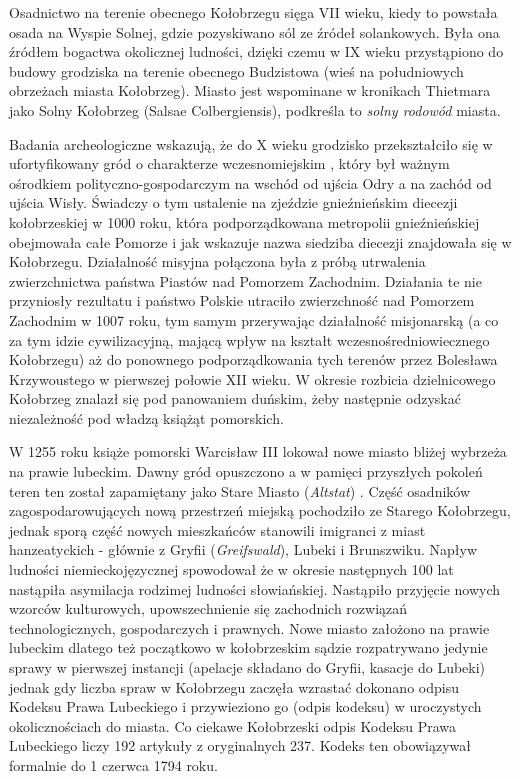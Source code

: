 \documentclass{amuthesis}
\begin{document}
Osadnictwo na terenie obecnego Kołobrzegu sięga VII wieku, kiedy to powstała osada na Wyspie Solnej, gdzie pozyskiwano sól ze źródeł solankowych.
Była ona źródłem bogactwa okolicznej ludności, dzięki czemu w IX wieku przystąpiono do budowy grodziska na terenie obecnego Budzistowa (wieś na południowych obrzeżach miasta Kołobrzeg).
Miasto jest wspominane w kronikach Thietmara jako Solny Kołobrzeg (Salsae Colbergiensis), podkreśla to \emph{solny rodowód} miasta.

Badania archeologiczne wskazują, że do X wieku grodzisko przekształciło się w ufortyfikowany gród o charakterze wczesnomiejskim \autocite{historia_kołobrzeg}, który był ważnym ośrodkiem polityczno-gospodarczym na wschód od ujścia Odry a na zachód od ujścia Wisły.
Świadczy o tym ustalenie na zjeździe gnieźnieńskim diecezji kołobrzeskiej w 1000 roku, która podporządkowana metropolii gnieźnieńskiej obejmowała całe Pomorze i jak wskazuje nazwa siedziba diecezji znajdowała się w Kołobrzegu.
Działalność misyjna połączona była z próbą utrwalenia zwierzchnictwa państwa Piastów nad Pomorzem Zachodnim.
Działania te nie przyniosły rezultatu i państwo Polskie utraciło zwierzchność nad Pomorzem Zachodnim w 1007 roku, tym samym przerywając działalność misjonarską (a co za tym idzie cywilizacyjną, mającą wpływ na kształt wczesnośredniowiecznego Kołobrzegu) aż do ponownego podporządkowania tych terenów przez Bolesława Krzywoustego w pierwszej połowie XII wieku.
W okresie rozbicia dzielnicowego Kołobrzeg znalazł się pod panowaniem duńskim, żeby następnie odzyskać niezależność pod władzą książąt pomorskich.

W 1255 roku książe pomorski Warcisław III lokował nowe miasto bliżej wybrzeża na prawie lubeckim.
Dawny gród opuszczono a w pamięci przyszłych pokoleń teren ten został zapamiętany jako Stare Miasto (\emph{Altstat}) \autocite{historia_kołobrzeg_wiki}.
Część osadników zagospodarowujących nową przestrzeń miejską pochodziło ze Starego Kołobrzegu, jednak sporą część nowych mieszkańców stanowili imigranci z miast hanzeatyckich - głównie z Gryfii (\emph{Greifswald}), Lubeki i Brunszwiku.
Napływ ludności niemieckojęzycznej spowodował że w okresie następnych 100 lat nastąpiła asymilacja rodzimej ludności słowiańskiej.
Nastąpiło przyjęcie nowych wzorców kulturowych, upowszechnienie się zachodnich rozwiązań technologicznych, gospodarczych i prawnych.
Nowe miasto założono na prawie lubeckim dlatego też początkowo w kołobrzeskim sądzie rozpatrywano jedynie sprawy w pierwszej instancji (apelacje składano do Gryfii, kasacje do Lubeki) jednak gdy liczba spraw w Kołobrzegu zaczęła wzrastać dokonano odpisu Kodeksu Prawa Lubeckiego i przywieziono go (odpis kodeksu) w uroczystych okolicznościach do miasta.
Co ciekawe Kołobrzeski odpis Kodeksu Prawa Lubeckiego liczy 192 artykuły z oryginalnych 237.
Kodeks ten obowiązywał formalnie do 1 czerwca 1794 roku.
\end{document}
